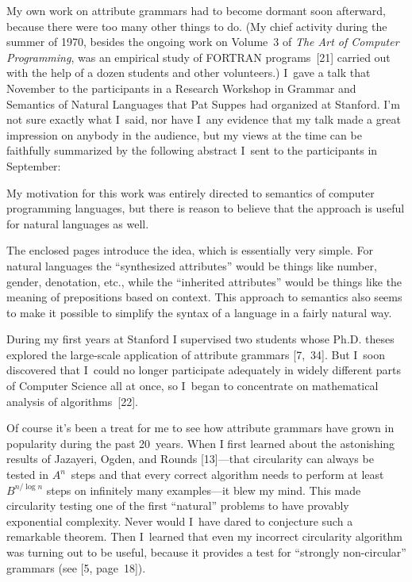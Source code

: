 My own work on attribute grammars had to become dormant soon afterward,
because there were too many other things to do. (My chief activity
during the summer of 1970, besides the ongoing work on Volume~3 of
{\sl The Art of Computer Programming}, was an empirical study of
{\ninerm FORTRAN} programs~[21]
carried out with the help of a dozen students and other volunteers.)
I~gave a talk that November to the participants in a Research Workshop
in Grammar and Semantics of Natural Languages that Pat Suppes had
organized at Stanford.  I'm not sure exactly what I~said, nor have
I~any evidence that my talk made a great impression on anybody in the
audience, but my views at the time can be faithfully summarized by the
following abstract I~sent to the participants in September:

{\narrower\smallskip\noindent
My motivation for this work was entirely directed to semantics of
computer programming languages, but there is reason to believe that
the approach is useful for natural languages as well.

\smallskip
\noindent
The enclosed pages introduce the idea, which is essentially very
simple. 
For natural languages the ``synthesized attributes'' would be things
like number, gender, denotation, etc., while the ``inherited
attributes'' would be things like the meaning of prepositions based on
context. This approach to semantics also seems to make it possible to
simplify the syntax of a language in a fairly natural way.
\smallskip}

During my first years at Stanford I supervised two students whose
Ph.D. theses explored the large-scale application of attribute
grammars [7,~34].
But I~soon discovered that I~could no longer participate adequately in
widely different parts of Computer Science all at once, so I~began to
concentrate on mathematical analysis of algorithms~[22].

Of course it's been a treat for me to see how attribute grammars have
grown in popularity during the past 20~years. When I first learned
about the astonishing results of Jazayeri, Ogden, and Rounds 
[13]---that
circularity can always be tested in $A^n$~steps and that every correct
algorithm needs to perform at least
$B^{n/\log n}$ steps on infinitely many
examples---it blew my mind. This made circularity testing one of the
first ``natural'' problems to have provably exponential complexity.
Never would I~have dared to conjecture such a remarkable theorem. Then
I~learned that even my incorrect circularity algorithm was turning out
to be useful, 
because it provides a test for ``strongly non-circular'' grammars (see
[5, page~18]).

